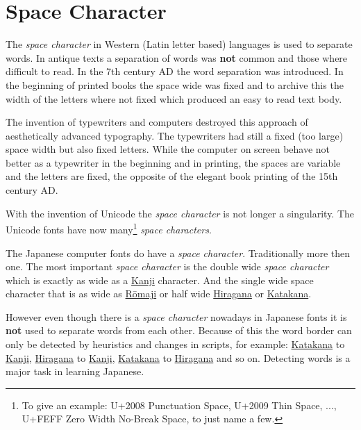 \section{Space Character} 
\label{sec:SpaceCharacter}

The \textit{space character} in Western (Latin letter based) languages is used
to separate words. In antique texts a separation of words was \textbf{not}
common and those where difficult to read.  In the 7th century AD the word
separation was introduced. In the beginning of printed books the space wide was
fixed and to archive this the width of the letters where not fixed which
produced an easy to read text body.

The invention of typewriters and computers destroyed this approach of
aesthetically advanced typography. The typewriters had still a fixed (too
large) space width but also fixed letters. While the computer on screen behave
not better as a typewriter in the beginning and in printing, the spaces are
variable and the letters are fixed, the opposite of the elegant book printing
of the 15th century AD.

With the invention of Unicode the \textit{space character} is not longer a
singularity.  The Unicode fonts have now many\footnote{To give an example:
U+2008 Punctuation Space, U+2009 Thin Space, ..., U+FEFF Zero Width No-Break
Space, to just name a few.} \textit{space characters}. 

The Japanese computer fonts do have a \textit{space character}. Traditionally
more then one.  The most important \textit{space character} is the double wide
\textit{space character} which is exactly as wide as a
\hyperref[sec:Kanji]{Kanji} character. And the single wide space character that
is as wide as \hyperref[sec:Romaji]{Rōmaji} or half wide
\hyperref[sec:Hiragana]{Hiragana} or \hyperref[sec:Katakana]{Katakana}. 

However even though there is a \textit{space character} nowadays in Japanese
fonts it is \textbf{not} used to separate words from each other. Because of
this the word border can only be detected by heuristics and changes in scripts,
for example: \hyperref[sec:Katakana]{Katakana} to \hyperref[sec:Kanji]{Kanji},
\hyperref[sec:Hiragana]{Hiragana} to \hyperref[sec:Kanji]{Kanji},
\hyperref[sec:Katakana]{Katakana} to \hyperref[sec:Hiragana]{Hiragana} and so
on. Detecting words is a major task in learning Japanese.

